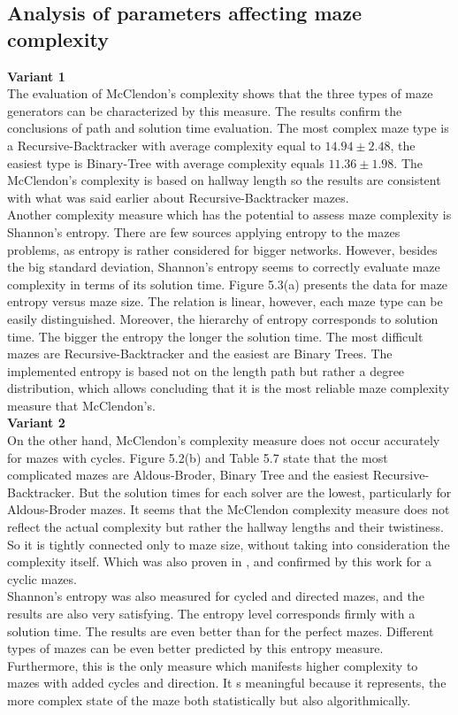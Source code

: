 \subsection{Analysis of parameters affecting maze complexity}
\textbf{Variant 1}\\
\indent The evaluation of McClendon's complexity shows that the three types of maze generators can be characterized by this measure. The results confirm the conclusions
of path and solution time evaluation. The most complex maze type is a Recursive-Backtracker with average complexity equal to $14.94 \pm 2.48$, the easiest type is 
Binary-Tree with average complexity equals $11.36 \pm 1.98$. The McClendon's complexity is based on hallway length so the results are consistent with what was said earlier about
Recursive-Backtracker mazes.\\
Another complexity measure which has the potential to assess maze complexity is Shannon's entropy. There are few sources applying entropy to the mazes problems,
as entropy is rather considered for bigger networks. However, besides the big standard deviation, Shannon's entropy seems to correctly evaluate maze complexity
in terms of its solution time. Figure 5.3(a) presents the data for maze entropy versus maze size. The relation is linear, however, each maze type can be easily distinguished.
Moreover, the hierarchy of entropy corresponds to solution time. The bigger the entropy the longer the solution time. The most difficult mazes are Recursive-Backtracker and 
the easiest are Binary Trees. The implemented entropy is based not on the length path but rather a degree distribution, which allows concluding that it is the most reliable 
maze complexity measure that McClendon's.\\
\indent \textbf{Variant 2}\\
\indent On the other hand, McClendon's complexity measure does not occur accurately for mazes with cycles. Figure 5.2(b) and Table 5.7 state that the most
complicated mazes are Aldous-Broder, Binary Tree and the easiest Recursive-Backtracker. But the solution times for each solver are the lowest, particularly for 
Aldous-Broder mazes. It seems that the McClendon complexity measure does not reflect the actual complexity but rather the hallway lengths and their twistiness. So it
is tightly connected only to maze size, without taking into consideration the complexity itself.
Which was also proven in \cite{4}, and confirmed by this work for a cyclic mazes.\\
Shannon's entropy was also measured for cycled and directed mazes, and the results are also very satisfying. The entropy level corresponds firmly with a solution time.
The results are even better than for the perfect mazes. Different types of mazes can be even better predicted by this entropy measure.
Furthermore, this is the only measure which manifests higher complexity to mazes with added cycles and direction. It s meaningful because it represents, the 
more complex state of the maze both statistically but also algorithmically.
